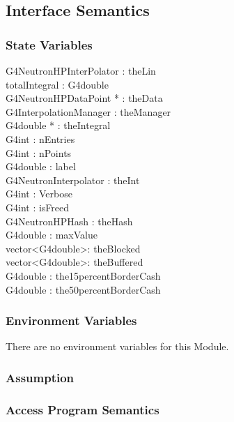 \documentclass[12pt]{article}
\begin{document}
\subsection{Interface Semantics}

\subsubsection{State Variables}%
G4NeutronHPInterPolator : theLin\\
totalIntegral : G4double\\
G4NeutronHPDataPoint * : theData\\
G4InterpolationManager : theManager\\
G4double * : theIntegral\\
G4int : nEntries\\
G4int : nPoints\\
G4double : label\\
G4NeutronInterpolator : theInt\\
G4int : Verbose\\
G4int : isFreed\\
G4NeutronHPHash : theHash\\
G4double : maxValue\\
vector\textless G4double\textgreater : theBlocked\\
vector\textless G4double\textgreater : theBuffered\\
G4double : the15percentBorderCash\\
G4double : the50percentBorderCash


\subsubsection{Environment Variables}%
There are no environment variables for this Module.

\subsubsection{Assumption}%

\subsubsection{Access Program Semantics}%

\end{document}
